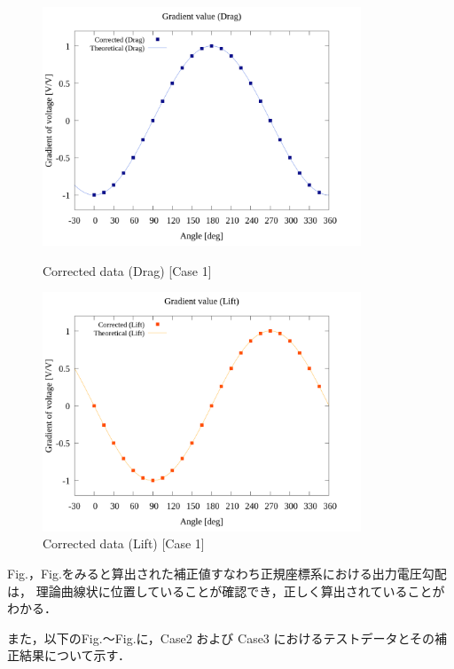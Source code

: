 \begin{figure}
    \footnotesize
    \begin{center}
        \includegraphics[width=95mm]{../../02_workspace/result/rotation_tx=15.0_tx=20.0/plot/21/21-4_corrected_angle_drag.png}
        \caption{Corrected data (Drag) [Case 1]}
        \includegraphics[width=95mm]{../../02_workspace/result/rotation_tx=15.0_tx=20.0/plot/21/21-4_corrected_angle_lift.png}
        \caption{Corrected data (Lift) [Case 1]}
    \end{center}
\end{figure}

\newpage

Fig.，Fig.をみると算出された補正値すなわち正規座標系における出力電圧勾配は，
理論曲線状に位置していることが確認でき，正しく算出されていることがわかる．

\newpage
また，以下のFig.～Fig.に，Case2 および Case3 におけるテストデータとその補正結果について示す．

\newpage

